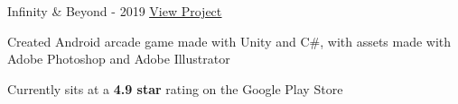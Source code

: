 \begin{cventries}
  \cventry
    {} %
    {Infinity \& Beyond - 2019} %
    {\href{https://play.google.com/store/apps/details?id=com.KKSGames.InifintyandBeyond}{\underline{View Project}}} %
    {} %
    {
      \begin{cvitems} %
        \item {Created Android arcade game made with Unity and C\#, with assets made with Adobe Photoshop and Adobe Illustrator}
        \item {Currently sits at a \textbf{4.9 star} rating on the Google Play Store}
      \end{cvitems}
    }


\end{cventries}
